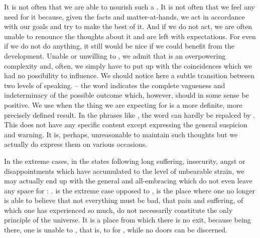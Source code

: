 \subpa It is not often that we are able to nourish such a .  It
is not often that we feel any need for it because, given the facts and
matter-at-hands, we act in accordance with our goals and try to make
the best of it.  And if we do not act, we are often unable to renounce
the thoughts about it and are left with expectations.  For even if we
do not do anything, it still would be nice if we could benefit from
the development.  Unable or unwilling to , we admit that
 is an overpowering complexity and, often, we simply
have to put up with the coincidences which we had no possibility to
influence.  We should notice here a subtle transition between two
levels of speaking.   -- the word  indicates the complete vagueness
and indeterminacy of the possible outcome which, however, should in
some sense be positive.  We use  when the thing we are
expecting for is a more definite, more precisely defined result.  In
the phrases like , the word  can hardly be repalced by . 
This  does not have any specific content except
expressing the general suspicion and warning.  It is, perhaps,
unreasonable to maintain such thoughts but we actually do express them
on various occasions.  

\subpa
In the extreme cases, in the states following
long suffering, insecurity, angst or disappointments which have
accumulated to the level of unbearable strain, we may actually end up
with the general and all-embracing  which do not even
leave any space for : .   is the extreme case opposed to ,
is the place where one no longer is able to believe that not
everything must be bad, that pain and suffering, of which one has 
experienced so much, do not necessarily constitute the only principle 
of the universe.   It is a place
from which there is no exit, because being there, one is unable to
, that is, to  for , while no
 doors can be discerned.


